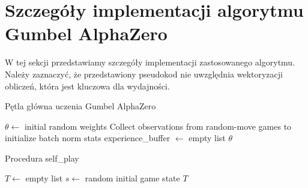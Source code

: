 \uchapter{\ChapterTitleAppendix}
\label{sec:appendix}

\section*{Szczegóły implementacji algorytmu Gumbel AlphaZero}

W tej sekcji przedstawiamy szczegóły implementacji zastosowanego algorytmu.
Należy zaznaczyć, że przedstawiony pseudokod nie uwzględnia
wektoryzacji obliczeń, która jest kluczowa dla wydajności.

\begin{algorithm}
    \caption{Pętla główna uczenia Gumbel AlphaZero}\label{alg:alphazero-main}
    $\theta \gets$ initial random weights\;
    Collect observations from random-move games to initialize batch norm stats\;
    experience\_buffer $\gets$ empty list\;
    \Return $\theta$\;
\end{algorithm}

\begin{algorithm}
    \caption{Procedura self\_play}\label{alg:alphazero-self-play}
    $T \gets$ empty list\;
    $s \gets$ random initial game state\;
    \Return $T$\;
\end{algorithm}

